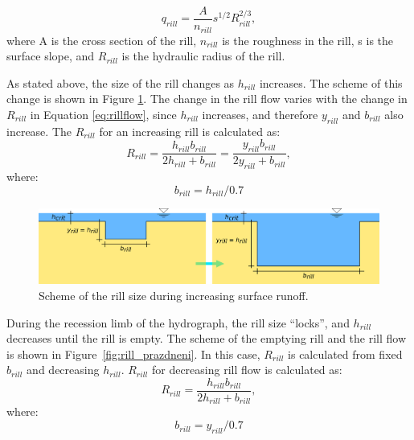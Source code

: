             \begin{equation}
                q_{rill} = \frac{A}{n_{rill}} s^{1/2} R_{rill}^{2/3},
              \label{eq:rillflow}
            \end{equation}
            where A is the cross section of the rill,  $n_{rill}$ is the roughness in the
            rill, s is the surface slope, and  $R_{rill}$  is the hydraulic radius of the
            rill. 

            As stated above, the size of the rill changes as $h_{rill}$ increases. The
            scheme of this change is shown in Figure \ref{fig:rill_plneni}. The change in
            the rill flow varies with the change in $R_{rill}$ in Equation
            \ref{eq:rillflow}, since $h_{rill}$ increases, and therefore $y_{rill}$ and
            $b_{rill}$ also increase. The $R_{rill}$ for an increasing rill is calculated
            as:
            \begin{equation}
                R_{rill} = \frac{h_{rill}b_{rill}}{2h_{rill}+b_{rill}}  =
                \frac{y_{rill}b_{rill}}{2y_{rill}+b_{rill}},
              \label{eq:rrill}
            \end{equation}
            where:
            \begin{equation}
              b_{rill} = h_{rill}/0.7
              \label{eq:brill}
            \end{equation}


            \begin{figure}[b]
                \centering
                \includegraphics[width=1\linewidth]{./img/rill_schema_plneni.png}
                \caption{Scheme of the rill size during increasing surface runoff.}
                \label{fig:rill_plneni}
            \end{figure}


            During the recession limb of the hydrograph, the rill size “locks”, and
            $h_{rill}$ decreases until the rill is empty. The scheme of the emptying rill
            and the rill flow is shown in Figure~\ref{fig:rill_prazdneni}. In this case,
            $R_{rill}$ is calculated from fixed $b_{rill}$ and decreasing $h_{rill}$.
            $R_{rill}$ for decreasing rill flow is calculated as:
            \begin{equation}
                R_{rill} = \frac{h_{rill}b_{rill}}{2h_{rill}+b_{rill}},
              \label{eq:rrill2}
            \end{equation}
            where:
            \begin{equation}
              b_{rill} = y_{rill}/0.7
              \label{eq:brill2}
            \end{equation}

